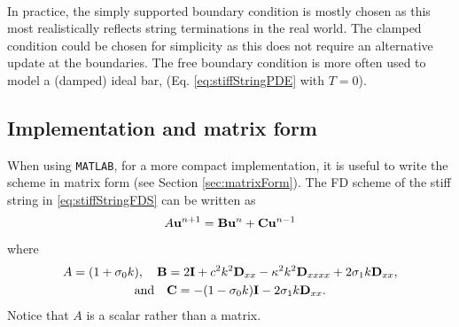 \\

In practice, the simply supported boundary condition is mostly chosen as this most realistically reflects string terminations in the real world. The clamped condition could be chosen for simplicity as this does not require an alternative update at the boundaries. The free boundary condition is more often used to model a (damped) ideal bar, (Eq. \eqref{eq:stiffStringPDE} with $T = 0$).

\subsection{Implementation and matrix form}\label{sec:implementationStiffString}
When using \texttt{MATLAB}, for a more compact implementation, it is useful to write the scheme in matrix form (see Section \ref{sec:matrixForm}). The FD scheme of the stiff string in \eqref{eq:stiffStringFDS} can be written as 
\begin{equation}\label{eq:matrixFormStiffString}
    A\mathbf{u}^{n+1} = \mathbf{B}\mathbf{u}^n + \mathbf{C} \mathbf{u}^{n-1}
\end{equation}
where 
\begin{equation*}
    \begin{gathered}
    A = (1+\sigma_{0} k), \quad \mathbf{B} = 2\mathbf{I} + c^2 k^2 \mathbf{D}_{xx} - \kappa^2 k^2 \mathbf{D}_{xxxx} + 2 \sigma_{1} k \mathbf{D}_{xx}, \\
    \text{and} \quad \mathbf{C} = -(1-\sigma_{0} k)\mathbf{I} - 2\sigma_{1} k \mathbf{D}_{xx}.
    \end{gathered}
\end{equation*}
Notice that $A$ is a scalar rather than a matrix.

